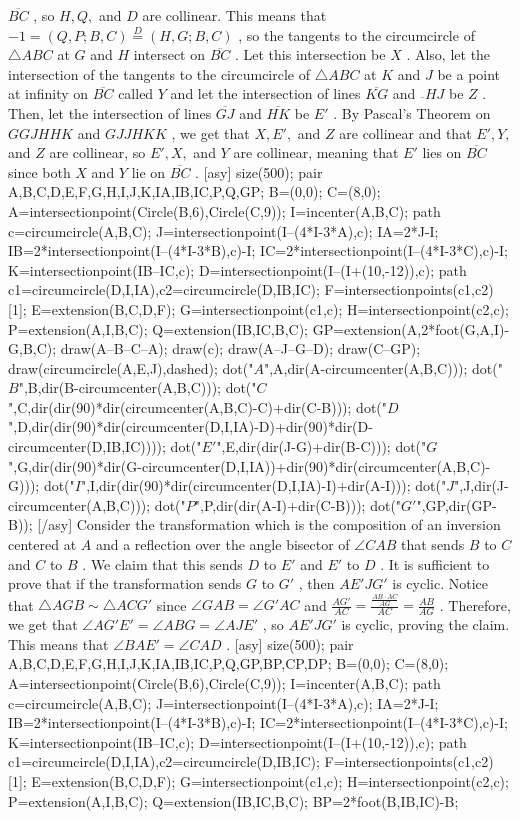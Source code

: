 \documentclass[12pt]{article}
\begin{document}
$\overline{BC}$ , so $H,Q,$ and $D$ are collinear. This means that $-1=(Q,P;B,C)\stackrel{D}{=}(H,G;B,C)$ , so the tangents to the circumcircle of $\triangle{}ABC$ at $G$ and $H$ intersect on $\overline{BC}$ . Let this intersection be $X$ . Also, let the intersection of the tangents to the circumcircle of $\triangle{}ABC$ at $K$ and $J$ be a point at infinity on $\overline{BC}$ called $Y$ and let the intersection of lines $\overline{KG}$ and $\overline{}HJ$ be $Z$ . Then, let the intersection of lines $\overline{GJ}$ and $\overline{HK}$ be $E'$ . By Pascal's Theorem on $GGJHHK$ and $GJJHKK$ , we get that $X,E',$ and $Z$ are collinear and that $E',Y,$ and $Z$ are collinear, so $E',X,$ and $Y$ are collinear, meaning that $E'$ lies on $\overline{BC}$ since both $X$ and $Y$ lie on $\overline{BC}$ . [asy] size(500); pair A,B,C,D,E,F,G,H,I,J,K,IA,IB,IC,P,Q,GP; B=(0,0); C=(8,0); A=intersectionpoint(Circle(B,6),Circle(C,9)); I=incenter(A,B,C); path c=circumcircle(A,B,C); J=intersectionpoint(I--(4*I-3*A),c); IA=2*J-I; IB=2*intersectionpoint(I--(4*I-3*B),c)-I; IC=2*intersectionpoint(I--(4*I-3*C),c)-I; K=intersectionpoint(IB--IC,c); D=intersectionpoint(I--(I+(10,-12)),c); path c1=circumcircle(D,I,IA),c2=circumcircle(D,IB,IC); F=intersectionpoints(c1,c2)[1]; E=extension(B,C,D,F); G=intersectionpoint(c1,c); H=intersectionpoint(c2,c); P=extension(A,I,B,C); Q=extension(IB,IC,B,C); GP=extension(A,2*foot(G,A,I)-G,B,C); draw(A--B--C--A); draw(c); draw(A--J--G--D); draw(C--GP); draw(circumcircle(A,E,J),dashed); dot("$A$",A,dir(A-circumcenter(A,B,C))); dot("$B$",B,dir(B-circumcenter(A,B,C))); dot("$C$",C,dir(dir(90)*dir(circumcenter(A,B,C)-C)+dir(C-B))); dot("$D$",D,dir(dir(90)*dir(circumcenter(D,I,IA)-D)+dir(90)*dir(D-circumcenter(D,IB,IC)))); dot("$E'$",E,dir(dir(J-G)+dir(B-C))); dot("$G$",G,dir(dir(90)*dir(G-circumcenter(D,I,IA))+dir(90)*dir(circumcenter(A,B,C)-G))); dot("$I$",I,dir(dir(90)*dir(circumcenter(D,I,IA)-I)+dir(A-I))); dot("$J$",J,dir(J-circumcenter(A,B,C))); dot("$P$",P,dir(dir(A-I)+dir(C-B))); dot("$G'$",GP,dir(GP-B)); [/asy] Consider the transformation which is the composition of an inversion centered at $A$ and a reflection over the angle bisector of $\angle{}CAB$ that sends $B$ to $C$ and $C$ to $B$ . We claim that this sends $D$ to $E'$ and $E'$ to $D$ . It is sufficient to prove that if the transformation sends $G$ to $G'$ , then $AE'JG'$ is cyclic. Notice that $\triangle{}AGB\sim\triangle{}ACG'$ since $\angle{}GAB=\angle{}G'AC$ and $\tfrac{AG'}{AC}=\tfrac{\frac{AB\cdot{}AC}{AG}}{AC}=\tfrac{AB}{AG}$ . Therefore, we get that $\angle{}AG'E'=\angle{}ABG=\angle{}AJE'$ , so $AE'JG'$ is cyclic, proving the claim. This means that $\angle{}BAE'=\angle{}CAD$ . [asy] size(500); pair A,B,C,D,E,F,G,H,I,J,K,IA,IB,IC,P,Q,GP,BP,CP,DP; B=(0,0); C=(8,0); A=intersectionpoint(Circle(B,6),Circle(C,9)); I=incenter(A,B,C); path c=circumcircle(A,B,C); J=intersectionpoint(I--(4*I-3*A),c); IA=2*J-I; IB=2*intersectionpoint(I--(4*I-3*B),c)-I; IC=2*intersectionpoint(I--(4*I-3*C),c)-I; K=intersectionpoint(IB--IC,c); D=intersectionpoint(I--(I+(10,-12)),c); path c1=circumcircle(D,I,IA),c2=circumcircle(D,IB,IC); F=intersectionpoints(c1,c2)[1]; E=extension(B,C,D,F); G=intersectionpoint(c1,c); H=intersectionpoint(c2,c); P=extension(A,I,B,C); Q=extension(IB,IC,B,C); BP=2*foot(B,IB,IC)-B; 
\end{document}
